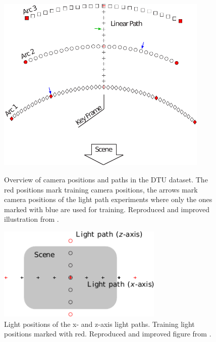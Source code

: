 \documentclass[thesis.tex]{subfiles}
\begin{document}
\begin{figure}[p]
	\centering
	\includegraphics[width=0.9\textwidth]{img/CameraPosbOwn.pdf}
	\caption{Overview of camera positions and paths in the DTU dataset. The red positions mark training camera positions, the arrows mark camera positions of the light path experiments where only the ones marked with blue are used for training. Reproduced and improved illustration from \citet[Figure 3, pp. 3]{aanaes2010recall}.}
	\label{fig:dtu_overview}
	\vspace{1cm}
	\centering
	\includegraphics[width=0.7\textwidth]{img/dtu_light_overview.pdf}
	\caption{Light positions of the x- and z-axis light paths. Training light positions marked with red. Reproduced and improved figure from \citet[Fig. 1, pp. 644]{larsen2012in}.}
	\label{fig:dtu_light_overview}
\end{figure}
\end{document}

